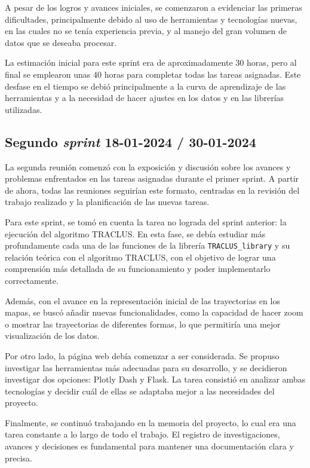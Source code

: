 A pesar de los logros y avances iniciales, se comenzaron a evidenciar las primeras dificultades, principalmente debido al uso de herramientas y tecnologías nuevas, en las cuales no se tenía experiencia previa, y al manejo del gran volumen de datos que se deseaba procesar. 

La estimación inicial para este sprint era de aproximadamente 30 horas, pero al final se emplearon unas 40 horas para completar todas las tareas asignadas. Este desfase en el tiempo se debió principalmente a la curva de aprendizaje de las herramientas y a la necesidad de hacer ajustes en los datos y en las librerías utilizadas.

\subsection{Segundo \textit{sprint} 18-01-2024 / 30-01-2024}

La segunda reunión comenzó con la exposición y discusión sobre los avances y problemas enfrentados en las tareas asignadas durante el primer sprint. A partir de ahora, todas las reuniones seguirían este formato, centradas en la revisión del trabajo realizado y la planificación de las nuevas tareas.

Para este sprint, se tomó en cuenta la tarea no lograda del sprint anterior: la ejecución del algoritmo TRACLUS. En esta fase, se debía estudiar más profundamente cada una de las funciones de la librería \texttt{TRACLUS\_library} y su relación teórica con el algoritmo TRACLUS, con el objetivo de lograr una comprensión más detallada de su funcionamiento y poder implementarlo correctamente.

Además, con el avance en la representación inicial de las trayectorias en los mapas, se buscó añadir nuevas funcionalidades, como la capacidad de hacer zoom o mostrar las trayectorias de diferentes formas, lo que permitiría una mejor visualización de los datos.

Por otro lado, la página web debía comenzar a ser considerada. Se propuso investigar las herramientas más adecuadas para su desarrollo, y se decidieron investigar dos opciones: Plotly Dash y Flask. La tarea consistió en analizar ambas tecnologías y decidir cuál de ellas se adaptaba mejor a las necesidades del proyecto.

Finalmente, se continuó trabajando en la memoria del proyecto, lo cual era una tarea constante a lo largo de todo el trabajo. El registro de investigaciones, avances y decisiones es fundamental para mantener una documentación clara y precisa.

